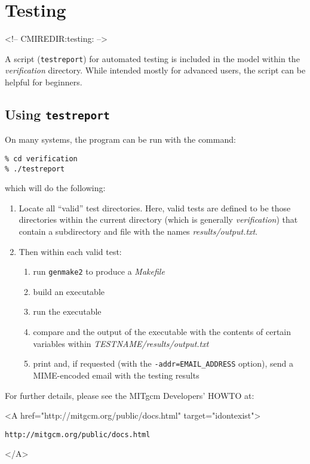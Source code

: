 
\section{Testing}
\label{sec:testing}
\label{www:testing}
\begin{rawhtml}
<!-- CMIREDIR:testing: -->
\end{rawhtml}

A script (\texttt{testreport}) for automated testing is included in
the model within the {\em verification} directory.  While intended
mostly for advanced users, the script can be helpful for beginners.

\subsection{Using \texttt{testreport}}

On many systems, the program can be run with the command:
\begin{verbatim}
% cd verification
% ./testreport
\end{verbatim}
which will do the following:
\begin{enumerate}
\item Locate all ``valid'' test directories.  Here, valid tests are
  defined to be those directories within the current directory (which
  is generally {\em verification}) that contain a subdirectory and
  file with the names {\em results/output.txt}.

\item Then within each valid test:
  \begin{enumerate}
  \item run \texttt{genmake2} to produce a {\em Makefile}
  \item build an executable
  \item run the executable
  \item compare and the output of the executable with the
    contents of certain variables within {\em
      TESTNAME/results/output.txt}
  \item print and, if requested (with the
    \texttt{-addr=EMAIL\_ADDRESS} option), send a MIME-encoded email
    with the testing results
  \end{enumerate}

\end{enumerate}

For further details, please see the MITgcm Developers' HOWTO at:
\begin{rawhtml} <A href="http://mitgcm.org/public/docs.html" target="idontexist"> \end{rawhtml}
\begin{verbatim}
http://mitgcm.org/public/docs.html
\end{verbatim}
\begin{rawhtml} </A> \end{rawhtml}


